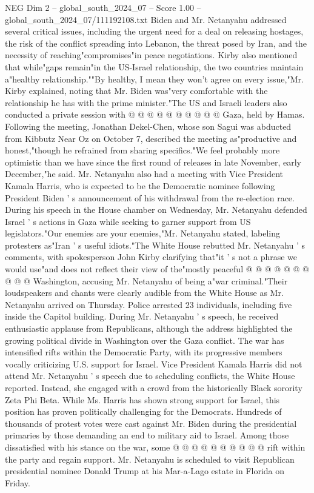\begin{textsample}{NEG Dim 2 – global\_south\_2024\_07 – Score 1.00 – global\_south\_2024\_07/111192108.txt}
Biden and Mr.
Netanyahu addressed several critical issues, including the urgent need for a deal on releasing hostages, the risk of the conflict spreading into Lebanon, the threat posed by Iran, and the necessity of reaching"compromises"in peace negotiations.
Kirby also mentioned that while"gaps remain"in the US-Israel relationship, the two countries maintain a"healthy relationship.""By healthy, I mean they won't agree on every issue,"Mr.
Kirby explained, noting that Mr.
Biden was"very comfortable with the relationship he has with the prime minister."The US and Israeli leaders also conducted a private session with @ @ @ @ @ @ @ @ @ @ Gaza, held by Hamas.
Following the meeting, Jonathan Dekel-Chen, whose son Sagui was abducted from Kibbutz Near Oz on October 7, described the meeting as"productive and honest,"though he refrained from sharing specifics."We feel probably more optimistic than we have since the first round of releases in late November, early December,"he said.
Mr.
Netanyahu also had a meeting with Vice President Kamala Harris, who is expected to be the Democratic nominee following President Biden ' s announcement of his withdrawal from the re-election race.
During his speech in the House chamber on Wednesday, Mr.
Netanyahu defended Israel ' s actions in Gaza while seeking to garner support from US legislators."Our enemies are your enemies,"Mr.
Netanyahu stated, labeling protesters as"Iran ' s useful idiots."The White House rebutted Mr.
Netanyahu ' s comments, with spokesperson John Kirby clarifying that"it ' s not a phrase we would use"and does not reflect their view of the"mostly peaceful @ @ @ @ @ @ @ @ @ @ Washington, accusing Mr.
Netanyahu of being a"war criminal."Their loudspeakers and chants were clearly audible from the White House as Mr.
Netanyahu arrived on Thursday.
Police arrested 23 individuals, including five inside the Capitol building.
During Mr.
Netanyahu ' s speech, he received enthusiastic applause from Republicans, although the address highlighted the growing political divide in Washington over the Gaza conflict.
The war has intensified rifts within the Democratic Party, with its progressive members vocally criticizing U.S. support for Israel.
Vice President Kamala Harris did not attend Mr.
Netanyahu ' s speech due to scheduling conflicts, the White House reported.
Instead, she engaged with a crowd from the historically Black sorority Zeta Phi Beta.
While Ms.
Harris has shown strong support for Israel, this position has proven politically challenging for the Democrats.
Hundreds of thousands of protest votes were cast against Mr.
Biden during the presidential primaries by those demanding an end to military aid to Israel.
Among those dissatisfied with his stance on the war, some @ @ @ @ @ @ @ @ @ @ rift within the party and regain support.
Mr.
Netanyahu is scheduled to visit Republican presidential nominee Donald Trump at his Mar-a-Lago estate in Florida on Friday.

\end{textsample}
